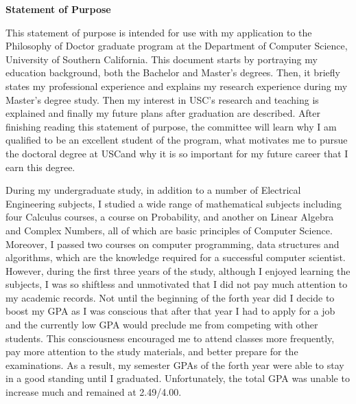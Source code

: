 \documentclass[a4paper,10pt]{report}
\newcommand{\university}{University of Southern California}
\newcommand{\department}{Department of Computer Science}
\newcommand{\uniabbre}{USC}
\begin{document}
\begin{center}
\textbf{\large Statement of Purpose}
\end{center}

\vspace{0.4cm}
This statement of purpose is intended for use with my application to the Philosophy of Doctor graduate program at the \department, \university \space. This document starts by portraying my education background, both the Bachelor and Master's degrees. Then, it briefly states my professional experience and explains my research experience during my Master's degree study. Then my interest in \uniabbre's research and teaching is explained and finally my future plans after graduation are described. After finishing reading this statement of purpose, the committee will learn why I am qualified to be an excellent student of the program, what motivates me to pursue the doctoral degree at \uniabbre \space and why it is so important for my future career that I earn this degree.

\vspace{0.2cm}
During my undergraduate study, in addition to a number of Electrical Engineering subjects, I studied a wide range of mathematical subjects including four Calculus courses, a course on Probability, and another on Linear Algebra and Complex Numbers, all of which are basic principles of Computer Science. Moreover, I passed two courses on computer programming, data structures and algorithms, which are the knowledge required for a successful computer scientist. However, during the first three years of the study, although I enjoyed learning the subjects, I was so shiftless and unmotivated that I did not pay much attention to my academic records. Not until the beginning of the forth year did I decide to boost my GPA as I was conscious that after that year I had to apply for a job and the currently low GPA would preclude me from competing with other students. This consciousness encouraged me to attend classes more frequently, pay more attention to the study materials, and better prepare for the examinations. As a result, my semester GPAs of the forth year were able to stay in a good standing until I graduated. Unfortunately, the total GPA was unable to increase much and remained at 2.49/4.00. 
\end{document}

